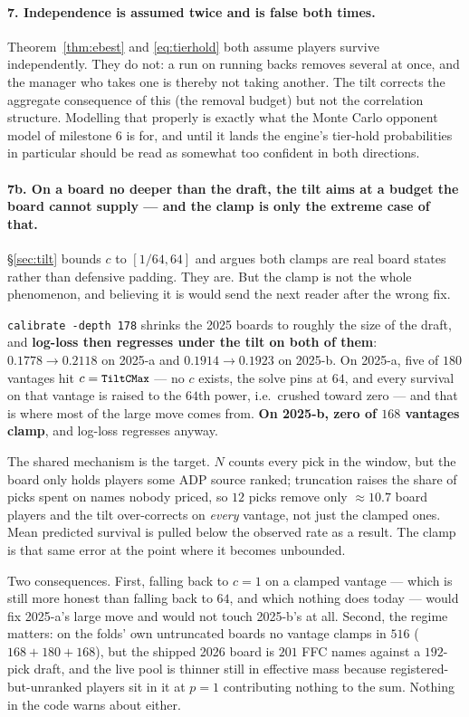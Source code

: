 \documentclass[10pt,a4paper]{article}
\theoremstyle{plain}
\theoremstyle{definition}
\theoremstyle{remark}
\newcommand{\code}[1]{\texttt{\small #1}}
\begin{document}
\paragraph{7. Independence is assumed twice and is false both times.}
Theorem~\ref{thm:ebest} and \eqref{eq:tierhold} both assume players survive
independently. They do not: a run on running backs removes several at once, and the
manager who takes one is thereby not taking another. The tilt corrects the aggregate
consequence of this (the removal budget) but not the correlation structure. Modelling
that properly is exactly what the Monte Carlo opponent model of milestone 6 is for, and
until it lands the engine's tier-hold probabilities in particular should be read as
somewhat too confident in both directions.

\paragraph{7b. On a board no deeper than the draft, the tilt aims at a budget the board
cannot supply --- and the clamp is only the extreme case of that.} \S\ref{sec:tilt} bounds
$c$ to $[1/64, 64]$ and argues both clamps are real board states rather than defensive
padding. They are. But the clamp is not the whole phenomenon, and believing it is would
send the next reader after the wrong fix.

\code{calibrate -depth 178} shrinks the 2025 boards to roughly the size of the draft, and
\textbf{log-loss then regresses under the tilt on both of them}: $0.1778 \to 0.2118$ on
2025-a and $0.1914 \to 0.1923$ on 2025-b. On 2025-a, five of $180$ vantages hit
$c = \code{TiltCMax}$ --- no $c$ exists, the solve pins at $64$, and every survival on that
vantage is raised to the $64$th power, i.e.\ crushed toward zero --- and that is where most
of the large move comes from. \textbf{On 2025-b, zero of $168$ vantages clamp}, and log-loss
regresses anyway.

The shared mechanism is the target. $N$ counts every pick in the window, but the board only
holds players some ADP source ranked; truncation raises the share of picks spent on names
nobody priced, so $12$ picks remove only $\approx 10.7$ board players and the tilt
over-corrects on \emph{every} vantage, not just the clamped ones. Mean predicted survival
is pulled below the observed rate as a result. The clamp is that same error at the point
where it becomes unbounded.

Two consequences. First, falling back to $c = 1$ on a clamped vantage --- which is still
more honest than falling back to $64$, and which nothing does today --- would fix 2025-a's
large move and would not touch 2025-b's at all. Second, the regime matters: on the folds'
own untruncated boards no vantage clamps in $516$ ($168 + 180 + 168$), but the shipped 2026
board is $201$ FFC names against a $192$-pick draft, and the live pool is thinner still in
effective mass because registered-but-unranked players sit in it at $p = 1$ contributing
nothing to the sum. Nothing in the code warns about either.
\end{document}
